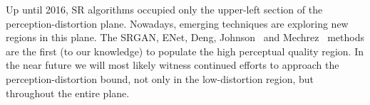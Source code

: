 Up until 2016, SR algorithms occupied only the upper-left section of the perception-distortion plane. Nowadays, emerging techniques are exploring new regions in this plane. The SRGAN, ENet, Deng, Johnson \etal~and Mechrez \etal~methods are the first (to our knowledge) to populate the high perceptual quality region. In the near future we will most likely witness continued efforts to approach the perception-distortion bound, not only in the low-distortion region, but throughout the entire plane.

